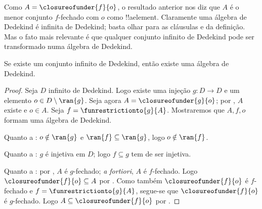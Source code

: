 \documentclass[../../../include/open-logic-section]{subfiles}
\begin{document}
Como $A = \closureofunder{f}{o}$, o resultado anterior nos diz que
$A$ é o menor conjunto $f$-fechado com $o$ como !!a{element}. Claramente uma
álgebra de Dedekind é infinita de Dedekind; basta olhar para as cláusulas
 e  da definição. Mas o fato mais
relevante é que qualquer conjunto infinito de Dedekind pode ser transformado
numa álgebra de Dedekind.

\begin{thm}
Se existe um conjunto infinito de Dedekind, então existe uma álgebra de Dedekind.
\end{thm}

\begin{proof}
Seja $D$ infinito de Dedekind. Logo existe uma injeção $g \colon D \to
D$ e um elemento $o  \in D \setminus \ran{g}$. Seja agora $A =
\closureofunder{g}{o}$; por , $A$ existe e $o \in A$. Seja $f =
\funrestrictionto{g}{A}$. Mostraremos que $A, f, o$ formam uma álgebra de
Dedekind.

Quanto a : $o \notin \ran{g}$ e $\ran{f}
\subseteq \ran{g}$, logo $o\notin \ran{f}$.

Quanto a : $g$ é injetiva em $D$; logo $f
\subseteq g$ tem de ser injetiva.

Quanto a : por , $A$ é $g$-fechado; \emph{a fortiori}, $A$ é $f$-fechado. Logo $\closureofunder{f}{o} \subseteq A$ por . Como também $\closureofunder{f}{o}$ é $f$-fechado e $f = \funrestrictionto{g}{A}$, segue-se que $\closureofunder{f}{o}$ é $g$-fechado. Logo $A \subseteq \closureofunder{f}{o}$ por .
\end{proof}
\end{document}
